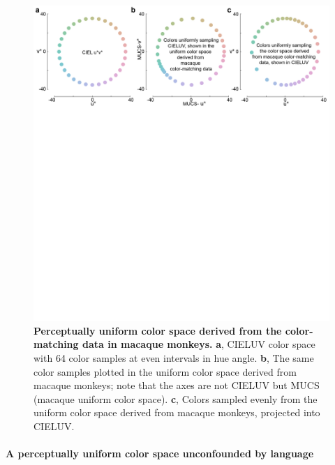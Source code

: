 \documentclass[9pt,biorxiv,lineno,onehalfspacing]{lapreprint}
\begin{document}
\begin{refsection}
\begin{figure}
    \begin{fullwidth}
    \centering
      \includegraphics[width=\textwidth+4cm,trim={0 15cm 0 0},clip]{Outputs/Paper/Figures/flat/F6_ColSpace_2}
           \caption{\textbf{Perceptually uniform color space derived from the color-matching data in macaque monkeys.} 
			\textbf{a}, CIELUV color space with 64 color samples at even intervals in hue angle. 
			\textbf{b}, The same color samples plotted in the uniform color space derived from macaque monkeys; note that the axes are not CIELUV but MUCS (macaque uniform color space). 
			\textbf{c}, Colors sampled evenly from the uniform color space derived from macaque monkeys, projected into CIELUV.}
		\label{fig:MACBEHcolorspace}
    \end{fullwidth}
\end{figure}

\paragraph{A perceptually uniform color space unconfounded by language}


\end{refsection}
\end{document}
